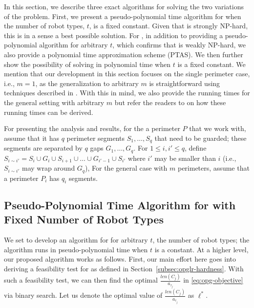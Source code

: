 In this section, we describe three exact algorithms for solving the two 
variations of the \opg problem. First, we present a pseudo-polynomial time
algorithm for \opglr when the number of robot types, $t$, is a fixed constant. 
Given that \opglr is strongly NP-hard, this is in a sense a best possible 
solution. 
%
For \opgmc, in addition to providing a pseudo-polynomial algorithm for 
arbitrary $t$, which confirms that \opgmc is weakly NP-hard, we also provide
a polynomial time approximation scheme (PTAS). We then further show the 
possibility of solving \opgmc in polynomial time when $t$ is a fixed constant. 
We mention that our development in this section focuses on the single 
perimeter case, i.e., $m = 1$, as the generalization to arbitrary $m$ is 
straightforward using techniques described in \cite{FenHanGaoYu19RSS}. With this in mind, 
we also provide the running times for the general setting with arbitrary $m$ 
but refer the readers to \cite{FenHanGaoYu19RSS} on how these running times can be derived. 

For presenting the analysis and results, for the a perimeter $P$ that we work 
with, assume that it has $q$ perimeter segments $S_1, \ldots, S_q$ that need 
to be guarded; these segments are separated by $q$ gaps $G_1, \ldots, G_q$. 
For $1 \le i, i' \le q$, define $S_{i\sim i'} = S_i \cup G_i \cup S_{i+1} \cup \ldots 
\cup G_{i'-1} \cup S_{i'}$ where $i'$ may be smaller than $i$ (i.e., $S_{i\sim i'}$
may wrap around $G_q$),
For the general case with $m$ perimeters, assume that a perimeter $P_i$ has
$q_i$ segments. 
\begin{comment}
\jy{A paper, or anything with some level of complexity to digest, should be 
hierarchical. So, at the beginning of a section, it is good to explain a bit 
of what will be covered so a reader will have an idea of the structure of 
the section.}
\end{comment}

\subsection{Pseudo-Polynomial Time Algorithm for \opglr with Fixed Number
of Robot Types}
\def\inc{{\sc Inc}\xspace}
\def\knapsack{\textbf{\textsc{Knapsack}}\xspace}
\def\opglrfeasible{{\sc OPG-lr-Feasible}\xspace}
\def\opgmcdp{{\sc OPG-mc-DP}\xspace}
We set to develop an algorithm for \opglr for arbitrary $t$, the number of robot 
types; the algorithm runs in pseudo-polynomial time when $t$ is a constant. 
At a higher level, our proposed algorithm works as follows. First, our main effort 
here goes into deriving a feasibility test for \opglrd as defined in 
Section~\ref{subsec:opglr-hardness}. With such a feasibility test, we can then 
find the optimal $\frac{len(C_j)}{a_{\tau_j}}$ in \eqref{eq:opg-objective} via binary search.
Let us denote the optimal value of $\frac{len(C_j)}{a_{\tau_j}}$ as $\ell^*$. 

